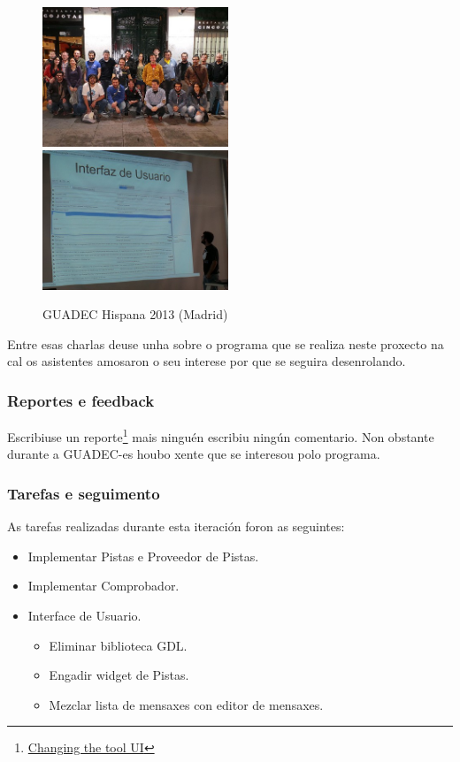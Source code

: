 \begin{figure}[h!]
    \centering
    \includegraphics[width=0.495\textwidth]{img/guadec_es_2013_1.jpg}
    \includegraphics[width=0.495\textwidth]{img/guadec_es_2013_2.jpg} 
    \caption{GUADEC Hispana 2013 (Madrid)}
    \label{fig:guadec2012}
\end{figure}

Entre esas charlas deuse unha sobre o programa que se realiza neste proxecto na cal os asistentes amosaron o seu interese por que se seguira desenrolando.

\subsubsection{Reportes e feedback}
Escribiuse un reporte\footnote{\href{http://aquelando.info/changing-the-tool-ui/}{Changing the tool UI}} mais ninguén escribiu ningún comentario. Non obstante durante a GUADEC-es houbo xente que se interesou polo programa.

\subsubsection{Tarefas e seguimento}

As tarefas realizadas durante esta iteración foron as seguintes:

\begin{itemize}
  \item Implementar Pistas e Proveedor de Pistas.
  \item Implementar Comprobador.
  \item Interface de Usuario.
    \begin{itemize}
      \item Eliminar biblioteca GDL.
      \item Engadir widget de Pistas.
      \item Mezclar lista de mensaxes con editor de mensaxes.
    \end{itemize}
\end{itemize}

